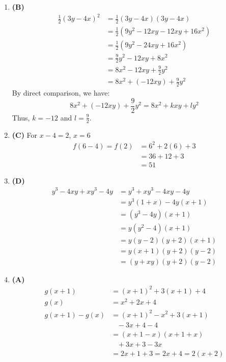\begin{multicols}{2}
\begin{enumerate}[label={\textbf{\arabic*.}}]
\item \textbf{(B)}
\begin{align*}
\frac{1}{2}(3y - 4x)^2 &= \frac{1}{2}(3y - 4x)(3y - 4x) \\
&= \frac{1}{2}(9y^2 - 12xy - 12xy + 16x^2) \\
&= \frac{1}{2}(9y^2 - 24xy + 16x^2) \\
&= \frac{9}{2}y^2 - 12xy + 8x^2 \\
&= 8x^2 - 12xy + \frac{9}{2}y^2 \\
&= 8x^2 + (-12xy) + \frac{9}{2}y^2
\end{align*}
By direct comparison, we have:
\[8x^2 + (-12xy) + \frac{9}{2}y^2 = 8x^2 + kxy + ly^2\]
Thus, \( k = -12 \) and \( l = \frac{9}{2} \).


\item \textbf{(C)} For \(x - 4 = 2\), \(x = 6\)
\begin{align*}
f(6 - 4) = f(2) &= 6^2 + 2(6) + 3 \\
& = 36 + 12 + 3 \\
& = 51
\end{align*}

\item \textbf{(D)}
\begin{align*}
y^3 - 4xy + xy^3 - 4y &= y^3 + xy^3 - 4xy - 4y \\
&= {y}^{3}(1 + x) - 4y(x + 1) \\
&= (y^3 - 4y)(x + 1) \\
&= y(y^2 - 4)(x + 1) \\
&= y(y - 2)(y + 2)(x + 1) \\
&= y(x + 1)(y + 2)(y - 2) \\
&= (y + xy)(y + 2)(y - 2)
\end{align*}

\item \textbf{(A)}
\begin{align*}
g(x + 1) &= (x + 1) ^2 + 3(x + 1) + 4  \\
g(x) & = x^2 + 2x + 4 \\
g(x + 1) - g(x) & = (x+ 1)^2 - x^2 + 3(x+1)  \\
& \hspace{10pt} - 3x + 4 - 4 \\
& = (x + 1 - x)(x + 1 + x) \\
&\hspace{10pt} + 3x + 3 - 3x \\
& = 2x + 1 + 3 = 2x + 4 = 2(x + 2)
\end{align*}


\end{enumerate}
\end{multicols}
